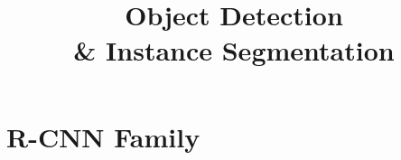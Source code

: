 \documentclass[10pt,aspectratio=169]{beamer}
\title[Object Detection]{Object Detection \\ \& Instance Segmentation}
\begin{document}










\section{R-CNN Family}

















\end{document}
